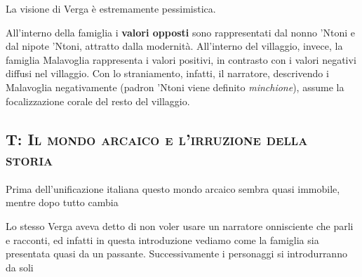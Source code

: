 \documentclass{book}
\newcommand{\evidenziatore}[1]{\textbf{#1}}
\newcounter{mar}
\begin{document}
La visione di Verga è estremamente pessimistica.

All'interno della famiglia i \evidenziatore{valori opposti} sono
rappresentati dal nonno 'Ntoni e dal nipote 'Ntoni, attratto dalla
modernità. All'interno del villaggio, invece, la famiglia Malavoglia
rappresenta i valori positivi, in contrasto con i valori negativi
diffusi nel villaggio. Con lo straniamento, infatti, il narratore,
descrivendo i Malavoglia negativamente (padron 'Ntoni viene definito
\emph{minchione}), assume la focalizzazione corale del resto del
villaggio.

\subsection{T: \textsc{Il mondo arcaico e l'irruzione della storia}}

Prima dell'unificazione italiana questo mondo arcaico sembra quasi
immobile, mentre dopo tutto cambia

Lo stesso Verga aveva detto di non voler usare un narratore onnisciente
che parli e racconti, ed infatti in questa introduzione vediamo come la
famiglia sia presentata quasi da un passante. Successivamente i
personaggi si introdurranno da soli
\setcounter{mar}{0}
\end{document}
